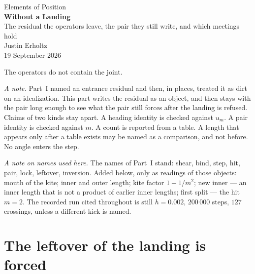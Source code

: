 \documentclass[10pt,a4paper]{article}
\theoremstyle{plain}
\theoremstyle{definition}
\theoremstyle{remark}
\begin{document}
\begin{center}
\vspace*{1.6em}
{\large Elements of Position}\\[1.4em]
{\LARGE\bfseries Without a Landing}\\[0.5em]
{\small The residual the operators leave, the pair they still write, and which meetings hold}\\[1.5em]
{\normalsize Justin Erholtz}\\[0.3em]
{\small 19 September 2026}
\end{center}

\vspace{1.2em}

\begin{center}
{\large The operators do not contain the joint.}
\end{center}

\vspace{1.2em}

\noindent
\textit{A note.}
Part~I named an entrance residual and then, in places, treated it as dirt on an idealization.
This part writes the residual as an object, and then stays with the pair long enough to see what the pair still forces after the landing is refused.
Claims of two kinds stay apart.
A heading identity is checked against \(u_m\).
A pair identity is checked against \(m\).
A count is reported from a table.
A length that appears only after a table exists may be named as a comparison, and not before.
No angle enters the step.

\vspace{0.5em}
\noindent
\textit{A note on names used here.}
The names of Part~I stand: shear, bind, step, hit, pair, lock, leftover, inversion.
Added below, only as readings of those objects: mouth of the kite; inner and outer length; kite factor \(1-1/m^2\); new inner --- an inner length that is not a product of earlier inner lengths; first split --- the hit \(m=2\).
The recorded run cited throughout is still \(h=0.002\), \(200\,000\) steps, \(127\) crossings, unless a different kick is named.

\tableofcontents

\section{The leftover of the landing is forced}
\end{document}
